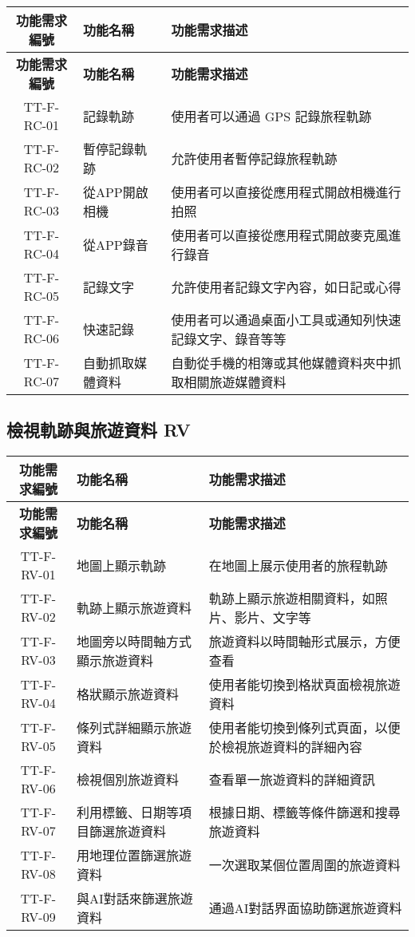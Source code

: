 \documentclass[12pt]{article}
\begin{document}
\begin{longtable}{|c|p{4.3cm}|p{8.9cm}|}
  \hline
  \textbf{功能需求編號} & \textbf{功能名稱} & \textbf{功能需求描述} \\
  \hline
  \endfirsthead
  \hline
  \textbf{功能需求編號} & \textbf{功能名稱} & \textbf{功能需求描述} \\
  \hline
  \endhead
  TT-F-RC-01 & 記錄軌跡 & 使用者可以通過 GPS 記錄旅程軌跡 \\
  \hline
  TT-F-RC-02 & 暫停記錄軌跡 & 允許使用者暫停記錄旅程軌跡 \\
  \hline
  TT-F-RC-03 & 從APP開啟相機 & 使用者可以直接從應用程式開啟相機進行拍照 \\
  \hline
  TT-F-RC-04 & 從APP錄音 & 使用者可以直接從應用程式開啟麥克風進行錄音 \\
  \hline
  TT-F-RC-05 & 記錄文字 & 允許使用者記錄文字內容，如日記或心得 \\
  \hline
  TT-F-RC-06 & 快速記錄 & 使用者可以通過桌面小工具或通知列快速記錄文字、錄音等等 \\
  \hline
  TT-F-RC-07 & 自動抓取媒體資料 & 自動從手機的相簿或其他媒體資料夾中抓取相關旅遊媒體資料 \\
  \hline
\end{longtable}

\subsection{檢視軌跡與旅遊資料 RV}

\begin{longtable}{|c|p{4.3cm}|p{8.9cm}|}
  \hline
  \textbf{功能需求編號} & \textbf{功能名稱} & \textbf{功能需求描述} \\
  \hline
  \endfirsthead
  \hline
  \textbf{功能需求編號} & \textbf{功能名稱} & \textbf{功能需求描述} \\
  \hline
  \endhead
  TT-F-RV-01 & 地圖上顯示軌跡 & 在地圖上展示使用者的旅程軌跡 \\
  \hline
  TT-F-RV-02 & 軌跡上顯示旅遊資料 & 軌跡上顯示旅遊相關資料，如照片、影片、文字等 \\
  \hline
  TT-F-RV-03 & 地圖旁以時間軸方式顯示旅遊資料 & 旅遊資料以時間軸形式展示，方便查看 \\
  \hline
  TT-F-RV-04 & 格狀顯示旅遊資料 & 使用者能切換到格狀頁面檢視旅遊資料 \\
  \hline
  TT-F-RV-05 & 條列式詳細顯示旅遊資料 & 使用者能切換到條列式頁面，以便於檢視旅遊資料的詳細內容 \\
  \hline
  TT-F-RV-06 & 檢視個別旅遊資料 & 查看單一旅遊資料的詳細資訊 \\
  \hline
  TT-F-RV-07 & 利用標籤、日期等項目篩選旅遊資料 & 根據日期、標籤等條件篩選和搜尋旅遊資料 \\
  \hline
  TT-F-RV-08 & 用地理位置篩選旅遊資料 & 一次選取某個位置周圍的旅遊資料 \\
  \hline
  TT-F-RV-09 & 與AI對話來篩選旅遊資料 & 通過AI對話界面協助篩選旅遊資料 \\
  \hline
\end{longtable}
\end{document}
